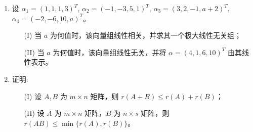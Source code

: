 \documentclass[12pt, a4paper, oneside, UTF8]{ctexbook}
\begin{document}
\begin{enumerate}[label=\arabic*.,start=7]
    \item 设 $\alpha_1 = (1,1,1,3)^T$, $\alpha_2 = (-1,-3,5,1)^T$, $\alpha_3 = (3,2,-1, a+2)^T$, $\alpha_4 = (-2,-6,10, a)^T$。
    \begin{enumerate}
        \item [(I)] 当 $a$ 为何值时，该向量组线性相关，并求其一个极大线性无关组；
        \item [(II)] 当 $a$ 为何值时，该向量组线性无关，并将 $\alpha = (4,1,6,10)^T$ 由其线性表示。
    \end{enumerate}
    
    \begin{solution}
    \newpage
    \end{solution}
    
    \item 证明:
    \begin{enumerate}
        \item [(I)] 设 $A, B$ 为 $m \times n$ 矩阵，则 $r(A+B) \leq r(A) + r(B)$；
        \item [(II)] 设 $A$ 为 $m \times n$ 矩阵，$B$ 为 $n \times s$ 矩阵，则 $r(AB) \leq \min\{r(A), r(B)\}$。
    \end{enumerate}
    
    \begin{solution}
    \newpage
    \end{solution}
\end{enumerate}
\end{document}
